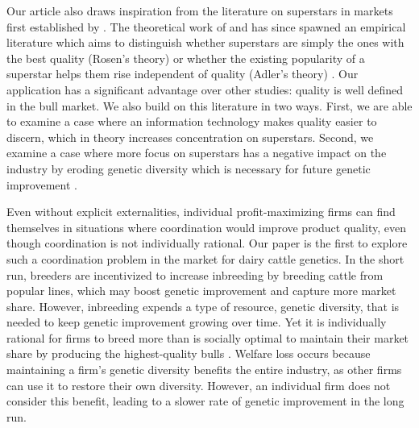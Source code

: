 \documentclass[12pt,letterpaper]{article}
\begin{document}
Our article also draws inspiration from the literature on superstars in markets first established by \citet{rosen_economics_1981}. 
The theoretical work of \citet{rosen_economics_1981} and \citet{adler1985stardom} has since spawned an empirical literature which aims to distinguish whether superstars are simply the ones with the best quality (Rosen's theory) or whether the existing popularity of a superstar helps them rise independent of quality (Adler's theory) \citep{gergaud_untalented_2021,franck_talent_2012,filimon2011test}.
Our application has a significant advantage over other studies: quality is well defined in the bull market.
We also build on this literature in two ways.
First, we are able to examine a case where an information technology makes quality easier to discern, which in theory increases concentration on superstars.
Second, we examine a case where more focus on superstars has a negative impact on the industry by eroding genetic diversity which is necessary for future genetic improvement \citep{makanjuola_effect_2020,scott_how_2021,Cole2023}.


Even without explicit externalities, individual profit-maximizing firms can find themselves in situations where coordination would improve product quality, even though coordination is not individually rational. Our paper is the first to explore such a coordination problem in the market for dairy cattle genetics. In the short run, breeders are incentivized to increase inbreeding by breeding cattle from popular lines, which may boost genetic improvement and capture more market share. However, inbreeding expends a type of resource, genetic diversity, that is needed to keep genetic improvement growing over time. Yet it is individually rational for firms to breed more than is socially optimal to maintain their market share by producing the highest-quality bulls \citep{Cole2019}. Welfare loss occurs because maintaining a firm's genetic diversity benefits the entire industry, as other firms can use it to restore their own diversity. However, an individual firm does not consider this benefit, leading to a slower rate of genetic improvement in the long run.

\end{document}
